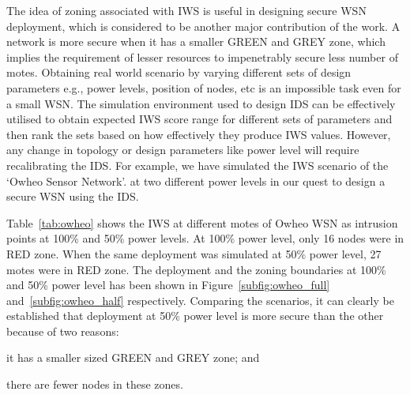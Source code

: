 \documentclass[conference]{IEEEtran}
\begin{document}
The idea of zoning associated with IWS is useful in designing secure WSN deployment, which is considered to be another major contribution of the work.
A network is more secure when it has a smaller GREEN and GREY zone, which implies the requirement of lesser resources to impenetrably secure less number of motes.
Obtaining real world scenario by varying different sets of design parameters e.g., power levels, position of nodes, etc is an impossible task even for a small WSN.
The simulation environment used to design IDS can be effectively utilised to obtain expected IWS score range for different sets of parameters and then rank the sets based on how effectively they produce IWS values. 
However, any change in topology or design parameters like power level will require recalibrating the IDS. 
For example, we have simulated the IWS scenario of the `Owheo Sensor Network'.
at two different power levels in our quest to design a secure WSN using the IDS.

Table~\ref{tab:owheo} shows the IWS at different motes of Owheo WSN as intrusion points at 100\% and 50\% power levels. 
At 100\% power level, %
only 16 nodes were in RED zone.
When the same deployment was simulated at 50\% power level, %
27 motes were in RED zone.
The deployment and the zoning boundaries at 100\% and  50\% power level has been shown in Figure~\ref{subfig:owheo_full} and~\ref{subfig:owheo_half} respectively.
Comparing the scenarios, it can clearly be established that deployment at 50\% power level is more secure than the other because of two reasons:
\begin{inparaenum}
\item it has a smaller sized GREEN and GREY zone; and 
\item there are fewer nodes in these zones. 
\end{inparaenum}
\end{document}
